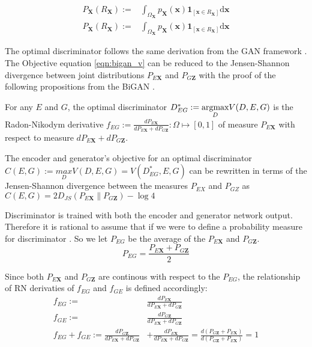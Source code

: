 \begin{align}
    P_{\mathbf{X}}\left(R_{\mathbf{X}}\right) :=&\int_{\Omega_{\mathbf{X}}} p_{\mathbf{X}}(\mathbf{x}) \mathbf{1}_{\left[\mathbf{x} \in R_{\mathbf{X}}\right]} \mathrm{d} \mathbf{x} \\[5pt]
    P_{\mathbf{X}}\left(R_{\mathbf{X}}\right) :=&\int_{\Omega_{\mathbf{X}}} p_{\mathbf{X}}(\mathbf{x}) \mathbf{1}_{\left[\mathbf{x} \in R_{\mathbf{X}}\right]} \mathrm{d} \mathbf{x}
\end{align}

The optimal discriminator follows the same derivation from the GAN framework
\cite{Goodfellow:2014:GAN:2969033.2969125}. The Objective equation \ref{eqn:bigan_v} can be reduced
to the Jensen-Shannon divergence between joint distributions $P_{E\mathbf{X}}$ and $P_{G\mathbf{Z}}$
with the proof of the following propositions from the BiGAN \cite{Donahue2017AdversarialFL}.

\begin{prop}
    \label{prop:bigan_1}
    For any $E$ and $G$, the optimal discriminator $D^*_{EG} := \\ \underset{D}{\text{argmax}}  V(D, E,
    G)$ is the Radon-Nikodym derivative $f_{EG} := \frac{dP_{E\mathbf{X}}}{dP_{E\mathbf{X}} +
    dP_{G\mathbf{Z}}}  : \Omega  \mapsto [0, 1]$ of measure $P_{E\mathbf{X}}$ with respect to measure
    $ dP_{E\mathbf{X}} + dP_{G\mathbf{Z}}$.
\end{prop}

\begin{prop}
    \label{prop:bigan_2}
  The encoder and generator's objective for an optimal discriminator $C(E, G):= \underset{D}{max}
  V(D, E, G) = V(D^*_{EG}, E, G)$ can be rewritten in terms of the Jensen-Shannon divergence between
  the measures $P_{EX}$ and $P_{GZ}$ as $C(E, G) = 2 D_{JS} (P_{E\mathbf{X}} \parallel P_{G\mathbf{Z}}) -
  \log 4$    
\end{prop}

Discriminator is trained with both the encoder and generator network output. Therefore it is
rational to assume that if we were to define a probability measure for discriminator . So we let $P_{EG}$
be the average of the $P_{E\mathbf{X}}$ and $P_{G\mathbf{Z}}$. 
\begin{equation}
  P_{EG} = \frac{P_{E\mathbf{X}} + P_{G\mathbf{Z}}}{2}  
\end{equation}

Since both $P_{E\mathbf{X}}$ and $P_{G\mathbf{Z}}$ are continous with respect to the $P_{EG}$, the
relationship of RN derivaties of $f_{EG}$ and $f_{GE}$ is defined accordingly:
\begin{align}
  f_{EG} :=& \frac{ d P_{E\mathbf{X}} }{ d P_{E\mathbf{X}} + d P_{G\mathbf{Z}}} \\[5pt]
  f_{GE} :=& \frac{ d P_{G\mathbf{Z}} }{ d P_{E\mathbf{X}} + d P_{G\mathbf{Z}}} \\[5pt]
  f_{EG} + f_{GE} :=   \frac{ d P_{G\mathbf{Z}} }{ d P_{E\mathbf{X}} + d P_{G\mathbf{Z}}} &+ \frac{ d P_{E\mathbf{X}} }{ d P_{E\mathbf{X}} + d P_{G\mathbf{Z}}} = \frac{ d( P_{G\mathbf{Z}} + P_{E\mathbf{X}}) }{ d( P_{G\mathbf{Z}} + P_{E\mathbf{X}} ) } = 1 
\end{align}

